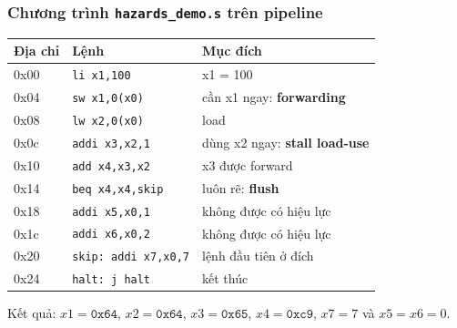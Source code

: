 \documentclass[11pt,a4paper]{article}
\begin{document}
\subsubsection*{Chương trình \texttt{hazards\_demo.s} trên pipeline}
\begin{center}
\small
\begin{tabular}{@{}lll@{}}
\toprule
\textbf{Địa chỉ} & \textbf{Lệnh} & \textbf{Mục đích}\\
\midrule
0x00 & \texttt{li x1,100} & x1 = 100\\
0x04 & \texttt{sw x1,0(x0)} & cần x1 ngay: \textbf{forwarding}\\
0x08 & \texttt{lw x2,0(x0)} & load\\
0x0c & \texttt{addi x3,x2,1} & dùng x2 ngay: \textbf{stall load-use}\\
0x10 & \texttt{add x4,x3,x2} & x3 được forward\\
0x14 & \texttt{beq x4,x4,skip} & luôn rẽ: \textbf{flush}\\
0x18 & \texttt{addi x5,x0,1} & không được có hiệu lực\\
0x1c & \texttt{addi x6,x0,2} & không được có hiệu lực\\
0x20 & \texttt{skip: addi x7,x0,7} & lệnh đầu tiên ở đích\\
0x24 & \texttt{halt: j halt} & kết thúc\\
\bottomrule
\end{tabular}
\end{center}
Kết quả: $x1=\mathtt{0x64}$, $x2=\mathtt{0x64}$, $x3=\mathtt{0x65}$, $x4=\mathtt{0xc9}$, $x7=7$ và $x5=x6=0$.
\end{document}
